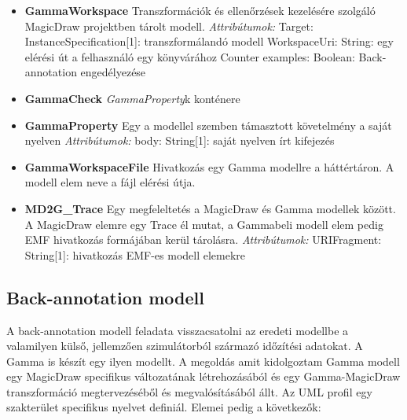 \begin{itemize}
	\item \textbf{GammaWorkspace} \newline
	Transzformációk és ellenőrzések kezelésére szolgáló MagicDraw projektben tárolt modell.
	\newline
	\textit{Attribútumok:}
	\subitem Target: InstanceSpecification[1]: transzformálandó modell
	\subitem WorkspaceUri: String: egy elérési út a felhasználó egy könyvárához
	\subitem Counter examples: Boolean: Back-annotation engedélyezése
	
	\item \textbf{GammaCheck} \newline
	\emph{GammaProperty}k konténere
	
	\item \textbf{GammaProperty} \newline
	Egy a modellel szemben támasztott követelmény a saját nyelven
	\newline
	\textit{Attribútumok:}
	\subitem body: String[1]: saját nyelven írt kifejezés

	\item \textbf{GammaWorkspaceFile} \newline
	Hivatkozás egy Gamma modellre a háttértáron. A modell elem neve a fájl elérési útja.
	
	\item \textbf{MD2G\_Trace} \newline
	Egy megfeleltetés a MagicDraw és Gamma modellek között. A MagicDraw elemre egy Trace él mutat, a Gammabeli modell elem pedig EMF hivatkozás formájában kerül tárolásra.
	\newline
	\textit{Attribútumok:}
	\subitem URIFragment: String[1]: hivatkozás EMF-es modell elemekre
	
	
\end{itemize}




\subsection{Back-annotation modell}
A back-annotation modell feladata visszacsatolni az eredeti modellbe a valamilyen külső, jellemzően szimulátorból származó időzítési adatokat. A Gamma is készít egy ilyen modellt. A megoldás amit kidolgoztam Gamma modell egy MagicDraw specifikus változatának létrehozásából és egy Gamma-MagicDraw transzformáció megtervezéséből és megvalósításából állt. Az UML profil egy szakterület specifikus nyelvet definiál. Elemei pedig a következők:

